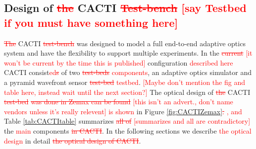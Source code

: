 \documentclass[12pt]{spieman}  %
\newcommand{\jrmadd}[1]{\textcolor{red}{#1}}
\newcommand{\jrmrmv}[1]{\textcolor{red}{\sout{#1}}}
\newcommand{\jrmcom}[1]{\textcolor{red}{[#1]}}
\begin{document}
\begin{spacing}{2}
\section{Design of \jrmrmv{the} CACTI \jrmrmv{Test-bench} \jrmcom{say Testbed if you must have something here}}
\jrmrmv{The} CACTI \jrmrmv{test-bench} was designed to model a full end-to-end adaptive optics system and have the flexibility to support multiple experiments. In the \jrmrmv{current} \jrmcom{it won't be current by the time this is published} configuration \jrmadd{described here} CACTI consist\jrmadd{ed}\jrmrmv{s} of two \jrmrmv{test-beds} \jrmadd{components}, an adaptive optics simulator and a pyramid wavefront sensor \jrmrmv{test-bed} \jrmadd{testbed}. \jrmcom{Maybe don't mention the fig and table here, instead wait until the next section?} The optical design of \jrmrmv{the} CACTI \jrmrmv{test-bed} \jrmrmv{was done in Zemax can be found} \jrmcom{this isn't an advert., don't name vendors unless it's really relevent} \jrmadd{is shown} in Figure \ref{fig:CACTIZemax}\jrmrmv{.} \jrmadd{, and} Table \ref{tab:CACTItable} summarizes \jrmrmv{all of} \jrmcom{summarizes and all are contradictory} the \jrmadd{main} components\jrmrmv{ in CACTI}. In the following sections we describe \jrmadd{ the optical design} in detail\jrmrmv{ the optical design of CACTI}. 


\end{spacing}
\end{document}
